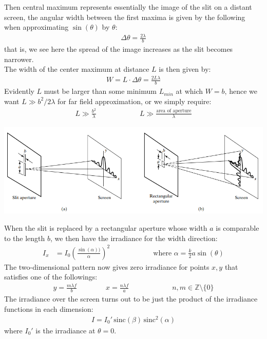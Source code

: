 \documentclass[11pt]{book}
\theoremstyle{break}
\theoremstyle{break}
\newcommand{\Z}{\mathbb{Z}}
\begin{document}
Then central maximum represents essentially the image of the slit on a distant screen, the angular width between the first maxima is given by the following when approximating $\sin(\theta)$ by $\theta$:
\begin{align*}
\Delta \theta = \frac{2\lambda}{b}
\end{align*}
that is, we see here the spread of the image increases as the slit becomes narrower.\\

The width of the center maximum at distance $L$ is then given by:
\begin{align*}
W = L\cdot \Delta \theta = \frac{2L \lambda}{b}
\end{align*}
Evidently $L$ must be larger than some minimum $L_{min}$ at which $W = b$, hence we want $L\gg b^2 / 2\lambda$ for far field approximation, or we simply require:
\begin{align*}
L \gg \frac{b^2}{\lambda} \qquad\qquad\qquad L \gg \frac{\text{area of aperture}}{\lambda}
\end{align*}
\begin{center}
\includegraphics[scale=0.8]{rectangularSlit}
\end{center}
When the slit is replaced by a rectangular aperture whose width $a$ is comparable to the length $b$, we then have the irradiance for the width direction:
\begin{align*}
I_x &= I_0 \left( \frac{\sin(\alpha))}{\alpha}\right)^2 \qquad \qquad \qquad \text{where } \alpha = \frac{k}{2}a\sin(\theta)
\end{align*}
The two-dimensional pattern now gives zero irradiance for points $x,y$ that satisfies one of the followings:
\begin{align*}
y = \frac{m\lambda f}{b}\qquad\qquad x = \frac{n\lambda f}{a}\qquad\qquad\qquad n,m \in \Z\setminus\{0\}
\end{align*}
The irradiance over the screen turns out to be just the product of the irradiance functions in each dimension:
\begin{align*}
I = I_0' \, \text{sinc}(\beta) \, \text{sinc}^2(\alpha)
\end{align*}
where $I_0'$ is the irradiance at $\theta = 0$. 
\end{document}
